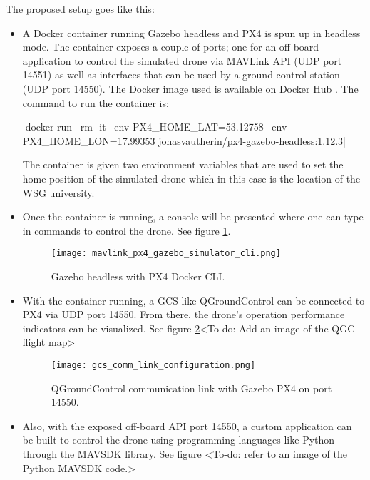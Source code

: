 The proposed setup goes like this:

\begin{itemize}
    \item A Docker container running Gazebo headless and PX4 is spun up in headless mode. The container exposes a couple of ports; one for an off-board application to control the simulated drone via MAVLink API (UDP port 14551) as well as interfaces that can be used by a ground control station (UDP port 14550). The Docker image used is available on Docker Hub \cite{px4gazeboheadlesssitldockerimage}. The command to run the container is:

          |docker run --rm -it --env PX4_HOME_LAT=53.12758 --env PX4_HOME_LON=17.99353 jonasvautherin/px4-gazebo-headless:1.12.3|

          The container is given two environment variables that are used to set the home position of the simulated drone which in this case is the location of the WSG university.
    \item Once the container is running, a console will be presented where one can type in commands to control the drone. See figure \ref{fig:mavlink-px4-gazebo-simulator-cli}.
          \begin{figure}[H]
              \centering \texttt{[image: mavlink\_px4\_gazebo\_simulator\_cli.png]}
              \caption{Gazebo headless with PX4 Docker CLI.}
              \label{fig:mavlink-px4-gazebo-simulator-cli}
          \end{figure}
    \item With the container running, a GCS like QGroundControl can be connected to PX4 via UDP port 14550. From there, the drone's operation performance indicators can be visualized. See figure \ref{fig:gcs-comm-link-configuration}<To-do: Add an image of the QGC flight map>
          \begin{figure}[H]
              \centering \texttt{[image: gcs\_comm\_link\_configuration.png]}
              \caption{QGroundControl communication link with Gazebo PX4 on port 14550.}
              \label{fig:gcs-comm-link-configuration}
          \end{figure}
    \item Also, with the exposed off-board API port 14550, a custom application can be built to control the drone using programming languages like Python through the MAVSDK library. See figure <To-do: refer to an image of the Python MAVSDK code.>
\end{itemize}

